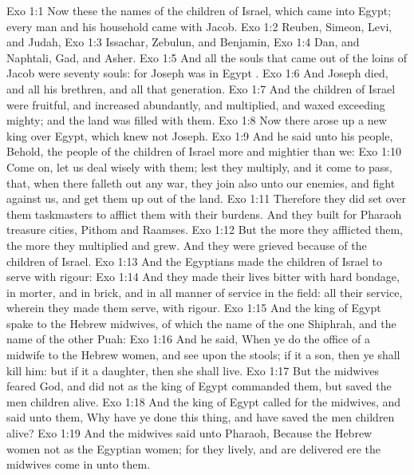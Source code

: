 \vs Exo 1:1 Now these  the names of the children of Israel, which came into Egypt; every man and his household came with Jacob.
\vs Exo 1:2 Reuben, Simeon, Levi, and Judah,
\vs Exo 1:3 Issachar, Zebulun, and Benjamin,
\vs Exo 1:4 Dan, and Naphtali, Gad, and Asher.
\vs Exo 1:5 And all the souls that came out of the loins of Jacob were seventy souls: for Joseph was in Egypt .
\vs Exo 1:6 And Joseph died, and all his brethren, and all that generation.
\vs Exo 1:7 And the children of Israel were fruitful, and increased abundantly, and multiplied, and waxed exceeding mighty; and the land was filled with them.
\vs Exo 1:8 Now there arose up a new king over Egypt, which knew not Joseph.
\vs Exo 1:9 And he said unto his people, Behold, the people of the children of Israel  more and mightier than we:
\vs Exo 1:10 Come on, let us deal wisely with them; lest they multiply, and it come to pass, that, when there falleth out any war, they join also unto our enemies, and fight against us, and  get them up out of the land.
\vs Exo 1:11 Therefore they did set over them taskmasters to afflict them with their burdens. And they built for Pharaoh treasure cities, Pithom and Raamses.
\vs Exo 1:12 But the more they afflicted them, the more they multiplied and grew. And they were grieved because of the children of Israel.
\vs Exo 1:13 And the Egyptians made the children of Israel to serve with rigour:
\vs Exo 1:14 And they made their lives bitter with hard bondage, in morter, and in brick, and in all manner of service in the field: all their service, wherein they made them serve,  with rigour.
\vs Exo 1:15 And the king of Egypt spake to the Hebrew midwives, of which the name of the one  Shiphrah, and the name of the other Puah:
\vs Exo 1:16 And he said, When ye do the office of a midwife to the Hebrew women, and see  upon the stools; if it  a son, then ye shall kill him: but if it  a daughter, then she shall live.
\vs Exo 1:17 But the midwives feared God, and did not as the king of Egypt commanded them, but saved the men children alive.
\vs Exo 1:18 And the king of Egypt called for the midwives, and said unto them, Why have ye done this thing, and have saved the men children alive?
\vs Exo 1:19 And the midwives said unto Pharaoh, Because the Hebrew women  not as the Egyptian women; for they  lively, and are delivered ere the midwives come in unto them.
